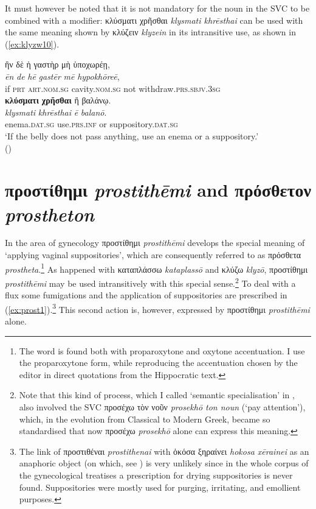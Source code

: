 \documentclass[output=paper,colorlinks,citecolor=brown]{langscibook}
\begin{document}
It must however be noted that it is not mandatory for the noun in the SVC to be combined with a modifier: κλύσματι χρῆσθαι \textit{klysmati khrēsthai} can be used with the same meaning shown by κλύζειν \textit{klyzein} in its intransitive use, as shown in (\ref{ex:klyzw10}).

\begin{exe}
\ex\label{ex:klyzw10}
\glll ἢν δὲ ἡ γαστὴρ μὴ ὑποχωρέῃ,  \\ 
\textit{ēn} \textit{de} \textit{hē} \textit{gastēr} \textit{mē} \textit{hypokhōreē},  \\
if \textsc{prt} \textsc{art.nom.sg} cavity.\textsc{nom.sg} not withdraw.\textsc{prs.sbjv.3sg}  \\

\glll \textbf{κλύσματι} \textbf{χρῆσθαι} ἢ βαλάνῳ. \\
\textit{klysmati} \textit{khrēsthai} \textit{ē} \textit{balanō}. \\
enema.\textsc{dat.sg} use.\textsc{prs.inf} or suppository.\textsc{dat.sg} \\
\glt ‘If the belly does not pass anything, use an enema or a suppository.' \\
\hspace*{\fill}()
\end{exe}

\section{προστίθημι \textit{prostithēmi} and πρόσθετον \textit{prostheton}}

In the area of gynecology προστίθημι \textit{prostithēmi} develops the special meaning of ‘applying vaginal suppositories’, which are consequently referred to as πρόσθετα \textit{prostheta}.\footnote{The word is found both with proparoxytone and oxytone accentuation. I use the proparoxytone form, while reproducing the accentuation chosen by the editor in direct quotations from the Hippocratic text.} As happened with καταπλάσσω \textit{kataplassō} and κλύζω \textit{klyzō}, προστίθημι \textit{prostithēmi} may be used intransitively with this special sense.\footnote{Note that this kind of process, which I called ‘semantic specialisation’ in \citet{Squeri2023}, also involved the SVC προσέχω τὸν νοῦν \textit{prosekhō ton noun} (‘pay attention’), which, in the evolution from Classical to Modern Greek, became so standardised that now προσέχω \textit{prosekhō} alone can express this meaning.} To deal with a flux some fumigations and the application of suppositories are prescribed in (\ref{ex:prost1}).\footnote{The link of προστιθέναι \textit{prostithenai} with ὁκόσα ξηραίνει \textit{hokosa xērainei} as an anaphoric object (on which, see \citealt{Luraghi2003}) is very unlikely since in the whole corpus of the gynecological treatises a prescription for drying suppositories is never found. Suppositories were mostly used for purging, irritating, and emollient purposes.} This second action is, however, expressed by προστίθημι \textit{prostithēmi} alone. 
\end{document}
